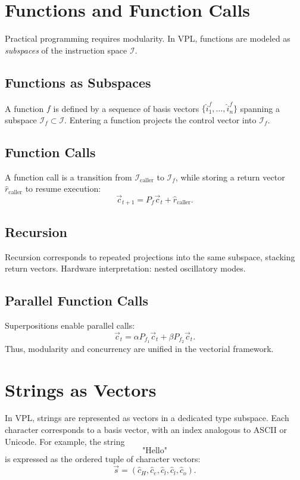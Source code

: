 \documentclass[12pt]{article}
\begin{document}
\section{Functions and Function Calls}
Practical programming requires modularity. In VPL, functions are modeled as
\emph{subspaces} of the instruction space $\mathcal{I}$.

\subsection{Functions as Subspaces}
A function $f$ is defined by a sequence of basis vectors
$\{\hat{i}_1^f, \dots, \hat{i}_n^f\}$ spanning a subspace $\mathcal{I}_f
\subset \mathcal{I}$. Entering a function projects the control vector into
$\mathcal{I}_f$.

\subsection{Function Calls}
A function call is a transition from $\mathcal{I}_{\text{caller}}$ to
$\mathcal{I}_f$, while storing a return vector $\hat{r}_{\text{caller}}$ to
resume execution:
\[
\vec{c}_{t+1} = P_f \vec{c}_t + \hat{r}_{\text{caller}}.
\]

\subsection{Recursion}
Recursion corresponds to repeated projections into the same subspace, stacking
return vectors. Hardware interpretation: nested oscillatory modes.

\subsection{Parallel Function Calls}
Superpositions enable parallel calls:
\[
\vec{c}_t = \alpha P_{f_1} \vec{c}_t + \beta P_{f_2} \vec{c}_t.
\]
Thus, modularity and concurrency are unified in the vectorial framework.

\section{Strings as Vectors}
In VPL, strings are represented as vectors in a dedicated type subspace. Each
character corresponds to a basis vector, with an index analogous to ASCII or
Unicode. For example, the string
\[
\text{"Hello"}
\]
is expressed as the ordered tuple of character vectors:
\[
\vec{s} = (\hat{c}_H, \hat{c}_e, \hat{c}_l, \hat{c}_l, \hat{c}_o).
\]
\end{document}
